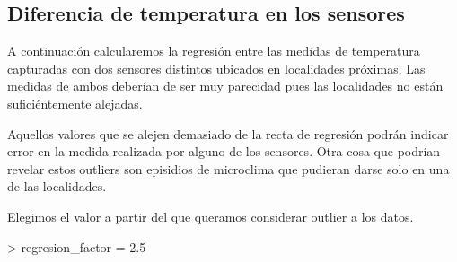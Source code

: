 \documentclass [a4paper] {article}
\begin{document}
\newpage
\subsection{Diferencia de temperatura en los sensores}

A continuación calcularemos la regresión entre las medidas de temperatura capturadas con dos sensores distintos ubicados en localidades próximas.
Las medidas de ambos deberían de ser muy parecidad pues las localidades no están suficiéntemente alejadas.

Aquellos valores que se alejen demasiado de la recta de regresión podrán indicar error en la medida realizada por alguno de los sensores.
Otra cosa que podrían revelar estos outliers son episidios de microclima que pudieran darse solo en una de las localidades.

Elegimos el valor a partir del que queramos considerar outlier a los datos.
\begin{Schunk}
\begin{Sinput}
> regresion_factor = 2.5
\end{Sinput}
\end{Schunk}
\end{document}
